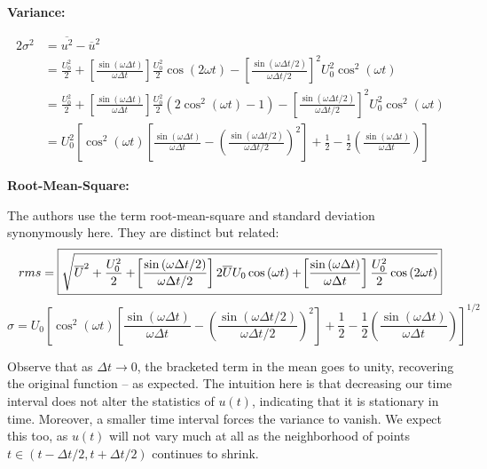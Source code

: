 \documentclass[a4paper]{article}
\begin{document}
\textbf{Variance:}

\begin{alignat*}{2}
	\sigma^{2} & = \overline{u^{2}} - \overline{u}^{2} \\
	     & = \frac{U_{0}^{2}}{2} + \!\left[ \frac{\sin\left( \omega \Delta t \right)}{\omega \Delta t} \right] \frac{U_{0}^{2}}{2} \cos\left( 2 \omega t \right) - \!\left[ \frac{\sin\left( \omega \Delta t / 2 \right)}{\omega \Delta t / 2} \right]^{2} U_{0}^{2} \cos^{2}\left( \omega t \right) \\ 
	     & = \frac{U_{0}^{2}}{2} + \!\left[ \frac{\sin\left( \omega \Delta t \right)}{\omega \Delta t} \right] \frac{U_{0}^{2}}{2} \!\left( 2 \cos^{2}\left( \omega t \right) - 1 \right) - \!\left[ \frac{\sin\left( \omega \Delta t / 2 \right)}{\omega \Delta t / 2} \right]^{2} U_{0}^{2} \cos^{2}\left( \omega t \right) \\
	     & = \boxed{ U_{0}^{2} \!\left[ \cos^{2}\left( \omega t \right) \!\left[ \frac{\sin\left( \omega \Delta t \right)}{\omega \Delta t} - \!\left( \frac{\sin\left( \omega \Delta t / 2 \right)}{\omega \Delta t / 2} \right)^{2} \right] + \frac{1}{2} - \frac{1}{2} \!\left( \frac{\sin\left( \omega \Delta t \right)}{\omega \Delta t} \right)  \right] }
\end{alignat*}

\textbf{Root-Mean-Square:}

The authors use the term root-mean-square and standard deviation synonymously here. They are distinct but related:
\[
	rms = \boxed{ \sqrt{ \overline{U}^{2} + \frac{U_{0}^{2}}{2} + \!\left[ \frac{\sin\left( \omega \Delta t / 2 \right)}{\omega \Delta t / 2} \right] 2 \overline{U} U_{0} \cos\left( \omega t \right) + \!\left[ \frac{\sin\left( \omega \Delta t \right)}{\omega \Delta t} \right] \frac{U_{0}^{2}}{2} \cos\left( 2 \omega t \right) } } \\
\]
\[
	\sigma = \boxed{ U_{0} \!\left[ \cos^{2}\left( \omega t \right) \!\left[ \frac{\sin\left( \omega \Delta t \right)}{\omega \Delta t} - \!\left( \frac{\sin\left( \omega \Delta t / 2 \right)}{\omega \Delta t / 2} \right)^{2} \right] + \frac{1}{2} - \frac{1}{2} \!\left( \frac{\sin\left( \omega \Delta t \right)}{\omega \Delta t} \right)  \right]^{1/2} }
\]

Observe that as \(\Delta t \rightarrow 0\), the bracketed term in the mean goes to unity, recovering the original function -- as expected. The intuition here is that decreasing our time interval does not alter the statistics of \(u \!\left( t \right) \), indicating that it is stationary in time. Moreover, a smaller time interval forces the variance to vanish. We expect this too, as \(u \!\left( t \right) \) will not vary much at all as the neighborhood of points \(t \in \!\left( t - \Delta t / 2, t + \Delta t / 2 \right) \) continues to shrink.
\end{document}
